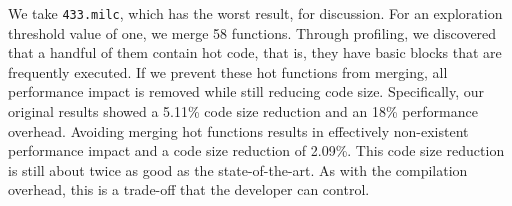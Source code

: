 We take \texttt{433.milc}, which has the worst result, for discussion. For an exploration threshold value of one, we merge 58 functions.
Through profiling, we discovered that a handful of them contain hot code, that is, they have basic blocks that are frequently executed. If we prevent these hot
functions from merging, all performance impact is removed while still reducing code size. Specifically, our original results showed a
5.11\% code size reduction and an 18\% performance overhead.
Avoiding merging hot functions results in effectively non-existent performance impact and
a code size reduction of 2.09\%.
This code size reduction is still about twice as good as the state-of-the-art. As with the
compilation overhead, this is a trade-off that the developer can control.






